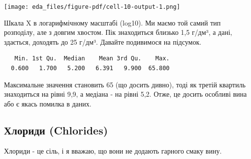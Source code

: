 \documentclass[
  letterpaper,
  DIV=11,
  numbers=noendperiod]{scrreprt}
\newenvironment{Shaded}{\begin{snugshade}}{\end{snugshade}}
\newcommand{\FunctionTok}[1]{\textcolor[rgb]{0.28,0.35,0.67}{#1}}
\newcommand{\NormalTok}[1]{\textcolor[rgb]{0.00,0.23,0.31}{#1}}
\newcommand{\SpecialCharTok}[1]{\textcolor[rgb]{0.37,0.37,0.37}{#1}}
\begin{document}
\texttt{[image: eda\_files/figure-pdf/cell-10-output-1.png]}

Шкала X в логарифмічному масштабі (log10). Ми маємо той самий тип
розподілу, але з довгим хвостом. Пік знаходиться близько 1,5 г/дм³, а
дані, здається, доходять до 25 г/дм³. Давайте подивимося на підсумок.

\begin{Shaded}
\end{Shaded}

\begin{verbatim}
   Min. 1st Qu.  Median    Mean 3rd Qu.    Max. 
  0.600   1.700   5.200   6.391   9.900  65.800 
\end{verbatim}

Максимальне значення становить 65 (що досить дивно), тоді як третій
квартиль знаходиться на рівні 9,9, а медіана - на рівні 5,2. Отже, це
досить особливі вина або є якась помилка в даних.

\subsection{Хлориди
(Chlorides)}\label{ux445ux43bux43eux440ux438ux434ux438-chlorides}

Хлориди - це сіль, і я вважаю, що вони не додають гарного смаку вину.
\end{document}
